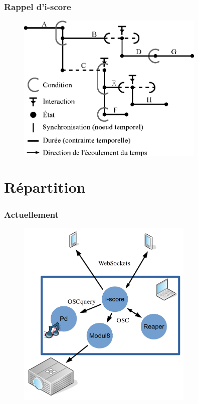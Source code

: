 \documentclass[handout]{beamer}
\begin{document}
\begin{frame}
\frametitle{Rappel d'i-score}
\begin{figure}
    \includegraphics[width=0.8\textwidth]{scenarios/iscore-example.eps}
\end{figure}
\end{frame}

\section{Répartition}

\begin{frame}
\frametitle{Actuellement}
\Large
\begin{figure}
    \vspace{-1cm}
    \includegraphics[width=0.75\textwidth]{draw/current.png}
\end{figure}

\end{frame}
\end{document}
